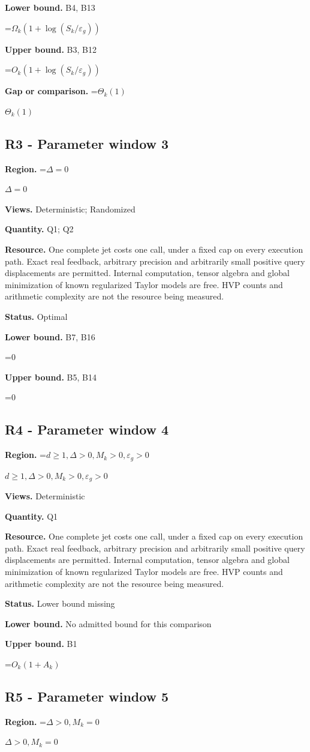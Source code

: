 \documentclass[10pt,a4paper]{article}
\newcommand{\AtlasMath}[1]{\par\begingroup\centering\setbox0=\hbox{$\displaystyle #1$}\ifdim\wd0>1.4\linewidth\typeout{ATLAS WIDE FORMULA: \the\wd0}\fi\ifdim\wd0>\linewidth\resizebox{\linewidth}{!}{\box0}\else\box0\fi\par\endgroup}
\newcommand{\AtlasInlineMath}[1]{\begingroup\setbox0=\hbox{$#1$}\ifdim\wd0>.4\linewidth\endgroup\AtlasMath{#1}\else\endgroup$#1$\fi}
\begin{document}
\textbf{Lower bound.} B4, B13

\AtlasMath{\Omega_k(1+\log(S_k/\varepsilon_g))}
\textbf{Upper bound.} B3, B12

\AtlasMath{O_k(1+\log(S_k/\varepsilon_g))}
\textbf{Gap or comparison.} \AtlasInlineMath{\Theta_k(1)}

\subsection{R3 - Parameter window 3}
\textbf{Region.} \AtlasInlineMath{\Delta=0}

\textbf{Views.} Deterministic; Randomized

\textbf{Quantity.} Q1; Q2

\textbf{Resource.} One complete jet costs one call, under a fixed cap on every execution path. Exact real feedback, arbitrary precision and arbitrarily small positive query displacements are permitted. Internal computation, tensor algebra and global minimization of known regularized Taylor models are free. HVP counts and arithmetic complexity are not the resource being measured.

\textbf{Status.} Optimal

\textbf{Lower bound.} B7, B16

\AtlasMath{0}
\textbf{Upper bound.} B5, B14

\AtlasMath{0}
\subsection{R4 - Parameter window 4}
\textbf{Region.} \AtlasInlineMath{d\ge 1, \Delta>0, M_k>0, \varepsilon_g>0}

\textbf{Views.} Deterministic

\textbf{Quantity.} Q1

\textbf{Resource.} One complete jet costs one call, under a fixed cap on every execution path. Exact real feedback, arbitrary precision and arbitrarily small positive query displacements are permitted. Internal computation, tensor algebra and global minimization of known regularized Taylor models are free. HVP counts and arithmetic complexity are not the resource being measured.

\textbf{Status.} Lower bound missing

\textbf{Lower bound.} No admitted bound for this comparison

\textbf{Upper bound.} B1

\AtlasMath{O_k(1+A_k)}
\subsection{R5 - Parameter window 5}
\textbf{Region.} \AtlasInlineMath{\Delta>0, M_k=0}
\end{document}
